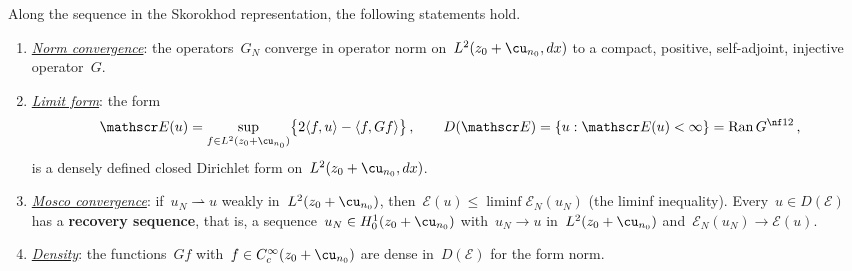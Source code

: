 \documentclass[11pt]{amsart}
\begin{document}
\begin{proposition}
\label{mfd:prop-killed-inverse}
Along the sequence in the Skorokhod representation, the following statements hold.
\begin{enumerate}[label=(\roman*)]
\item \underline{\emph{Norm convergence}}: the operators~$G_N$ converge in operator norm on~$L^2(z_0+\cu_{n_0},dx)$ to a compact, positive, self-adjoint, injective operator~$G$.
\item \underline{\emph{Limit form}}: the form
\begin{equation}
	\mathscr E(u)=\sup_{f\in L^2(z_0+\cu_{n_0})}\bigl\{2\langle f,u\rangle-\langle f,Gf\rangle\bigr\}\,,
	\qquad D(\mathscr E)=\{u:\mathscr E(u)<\infty\}=\operatorname{Ran}G^{\nf12}\,,
	\label{eq:mfd-18}
\end{equation}
is a densely defined closed Dirichlet form on~$L^2(z_0+\cu_{n_0},dx)$.
\item \underline{\emph{Mosco convergence}}: if~$u_N\rightharpoonup u$ weakly in~$L^2(z_0+\cu_{n_0})$, then~$\mathscr E(u)\leq\liminf \mathscr E_N(u_N)$ (the liminf inequality). Every~$u\in D(\mathscr E)$ has a \textbf{recovery sequence}, that is, a sequence~$u_N\in H^1_0(z_0+\cu_{n_0})$ with~$u_N\to u$ in~$L^2(z_0+\cu_{n_0})$ and~$\mathscr E_N(u_N)\to \mathscr E(u)$.
\item \underline{\emph{Density}}: the functions~$Gf$ with~$f\in C_c^\infty(z_0+\cu_{n_0})$ are dense in~$D(\mathscr E)$ for the form norm.
\end{enumerate}
\end{proposition}
\end{document}

